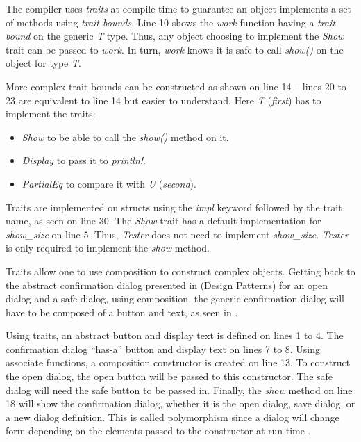 
The compiler uses \textit{traits} at compile time to guarantee an object implements a set of methods using \textit{trait bounds}.
Line 10 shows the \textit{work} function having a \textit{trait bound} on the generic \textit{T} type.
Thus, any object choosing to implement the \textit{Show} trait can be passed to \textit{work}.
In turn, \textit{work} knows it is safe to call \textit{show()} on the object for type \textit{T}.

More complex trait bounds can be constructed as shown on line 14 -- lines 20 to 23 are equivalent to line 14 but easier to understand.
Here \textit{T} (\textit{first}) has to implement the traits:
\begin{itemize}
	\item \textit{Show} to be able to call the \textit{show()} method on it.
	\item \textit{Display} to pass it to \textit{println!}.
	\item \textit{PartialEq} to compare it with \textit{U} (\textit{second}).
\end{itemize}

Traits are implemented on structs using the \textit{impl} keyword followed by the trait name, as seen on line 30.
The \textit{Show} trait has a default implementation for \textit{show\_size} on line 5.
Thus, \textit{Tester} does not need to implement \textit{show\_size}.
\textit{Tester} is only required to implement the \textit{show} method.

Traits allow one to use composition to construct complex objects.
Getting back to the abstract confirmation dialog presented in  (Design Patterns) for an open dialog and a safe dialog, using composition, the generic confirmation dialog will have to be composed of a button and text, as seen in .


Using traits, an abstract button and display text is defined on lines 1 to 4.
The confirmation dialog ``has-a'' \cite{malik_09_01} button and display text on lines 7 to 8.
Using associate functions\footnotemark[\ref{associate}], a composition constructor is created on line 13.
To construct the open dialog, the open button will be passed to this constructor.
The safe dialog will need the safe button to be passed in.
Finally, the \textit{show} method on line 18 will show the confirmation dialog, whether it is the open dialog, save dialog, or a new dialog definition.
This is called polymorphism since a dialog will change form depending on the elements passed to the constructor at run-time \cite{savitch_15_01,malik_09_01,gamma_94_01}.

